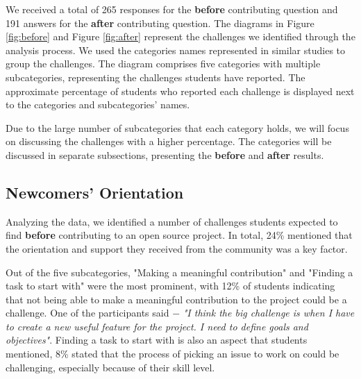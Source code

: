 \documentclass[sigconf]{acmart}
\begin{document}
\begin{sloppy}
We received a total of 265 responses for the \textbf{before} contributing question and  191 answers for the \textbf{after} contributing question. The diagrams in Figure \ref{fig:before} and Figure \ref{fig:after} represent the challenges we identified through the analysis process. We used the categories names represented in similar studies \cite{steinmacher2016overcoming, steinmacher2019overcoming} to group the challenges. The diagram comprises five categories with multiple subcategories, representing the challenges students have reported. The approximate percentage of students who reported each challenge is displayed next to the categories and subcategories' names. 

Due to the large number of subcategories that each category holds, we will focus on discussing the challenges with a higher percentage. The categories will be discussed in separate subsections, presenting the \textbf{before} and \textbf{after} results.


\subsection{Newcomers' Orientation}

Analyzing the data, we identified a number of challenges students expected to find \textbf{before} contributing to an open source project. In total, 24\% mentioned that the orientation and support they received from the community was a key factor. 

Out of the five subcategories, "Making a meaningful contribution" and "Finding a task to start with" were the most prominent, with 12\% of students indicating that not being able to make a meaningful contribution to the project could be a challenge. One of the participants said $-$ \textit{"I think the big challenge is when I have to create a new useful feature for the project. I need to define goals and objectives"}. Finding a task to start with is also an aspect that students mentioned, 8\% stated that the process of picking an issue to work on could be challenging, especially because of their skill level. 



\end{sloppy}
\end{document}
